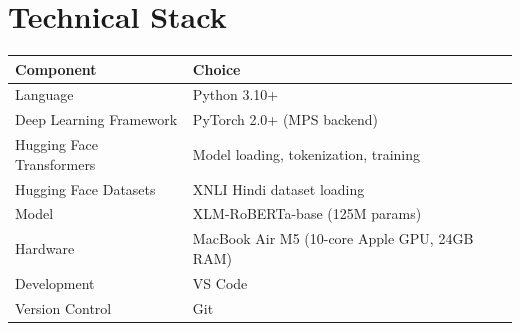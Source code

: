 \section{Technical Stack}

\begin{table}[h]
\centering
\begin{tabularx}{\textwidth}{lX}
\toprule
\textbf{Component} & \textbf{Choice} \\
\midrule
Language & Python 3.10+ \\
Deep Learning Framework & PyTorch 2.0+ (MPS backend) \\
Hugging Face Transformers & Model loading, tokenization, training \\
Hugging Face Datasets & XNLI Hindi dataset loading \\
Model & XLM-RoBERTa-base (125M params) \\
Hardware & MacBook Air M5 (10-core Apple GPU, 24GB RAM) \\
Development & VS Code \\
Version Control & Git \\
\bottomrule
\end{tabularx}
\end{table}
